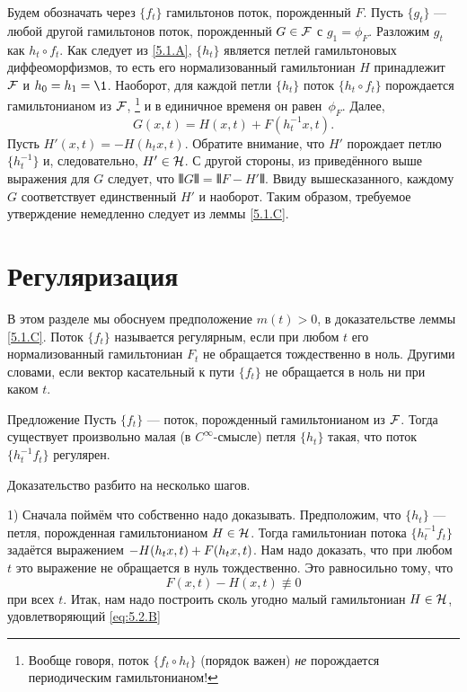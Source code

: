 Будем обозначать через $\{f_t\}$ гамильтонов поток, порожденный $F$.
Пусть $\{g_t\}$ — любой другой гамильтонов поток, порожденный $G \in \mathcal{F}$ с $g_1 = \phi_F$.
Разложим $g_t$ как $h_t \circ f_t$.
Как следует из \ref{5.1.A}, $\{h_t\}$ является петлей гамильтоновых диффеоморфизмов, то есть его нормализованный гамильтониан $H$ принадлежит $\mathcal{F}$ и $h_0 = h_1 = \1$.
Наоборот, для каждой петли $\{h_t\}$ поток $\{h_t \circ f_t\}$ порождается гамильтонианом из $\mathcal{F}$,%
\footnote{Вообще говоря, поток $\{f_t \circ h_t\}$ (порядок важен) {}\emph{не} порождается периодическим гамильтонианом!}
и в единичное временя он равен~$\phi_F$.
Далее, 
\[G (x, t) = H (x, t) + F (h^{-1}_t x, t).\]
Пусть $H' (x, t) = -H (h_t x, t)$.
Обратите внимание, что $H'$ порождает петлю $\{h^{-1}_t\}$ и, следовательно, $H'\in\mathcal{H}$.
С другой стороны, из приведённого выше выражения для $G$ следует, что $\VERT G \VERT = \VERT F - H' \VERT$.
Ввиду вышесказанного, каждому $G$ соответствует единственный $H'$ и наоборот.
Таким образом, требуемое утверждение немедленно следует из леммы \ref{5.1.C}.
\qeds

\section{Регуляризация}\label{5.2}

В этом разделе мы обоснуем предположение $m(t)>0$, в доказательстве леммы \ref{5.1.C}.
Поток $\{f_t\}$ называется регулярным, если при любом $t$ его нормализованный гамильтониан $F_t$ не обращается тождественно в ноль.
Другими словами, если вектор касательный к пути $\{f_t\}$ не
обращается в ноль ни при каком $t$.

\begin{thm}{Предложение}\label{5.2.A}
Пусть $\{f_t\}$ — поток, порожденный гамильтонианом из $\mathcal{F}$.
Тогда существует произвольно малая (в $C^\infty$-смысле) петля $\{h_t\}$ такая, что поток $\{h^{-1}_t f_t\}$ регулярен.
\end{thm}

Доказательство разбито на несколько шагов.

1) Сначала поймём что собственно надо доказывать.
Предположим, что $\{h_t\}$ — петля, порожденная гамильтонианом $H \in \mathcal{H}$.
Тогда гамильтониан потока $\{h^{-1}_t f_t\}$ задаётся выражением $-H (h_t x, t) \z+ F (h_t x, t)$.
Нам надо доказать, что при любом $t$ это выражение не обращается в нуль тождественно.
Это равносильно тому, что
\begin{equation}
F (x, t) - H (x, t) \not\equiv 0\label{eq:5.2.B}
\end{equation}
при всех $t$.
Итак, нам надо построить сколь угодно малый гамильтониан $H \in \mathcal{H}$, удовлетворяющий \ref{eq:5.2.B}

